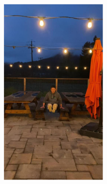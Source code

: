 \documentclass[letterpaper,12pt]{article}
\begin{document}
	
	\begin{figure}[htbp] 
		\centering 
		\begin{subfigure}{0.128\textwidth}
			\includegraphics[width=\linewidth]{LoLi-Phone-imgT_1/input}
			\captionsetup{font=scriptsize}
			\caption{}
			\label{fig: LoLi-Phone-imgT_1_a}
		\end{subfigure}
		\begin{subfigure}{0.128\textwidth}

\end{subfigure}
\end{figure}
\end{document}
